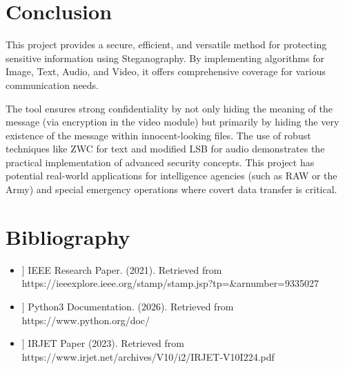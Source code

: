 \documentclass[12pt,a4paper]{report}
\begin{document}
\chapter*{Conclusion}
This project provides a secure, efficient, and versatile method for protecting sensitive information using Steganography. By implementing algorithms for Image, Text, Audio, and Video, it offers comprehensive coverage for various communication needs. 

The tool ensures strong confidentiality by not only hiding the meaning of the message (via encryption in the video module) but primarily by hiding the very existence of the message within innocent-looking files. The use of robust techniques like ZWC for text and modified LSB for audio demonstrates the practical implementation of advanced security concepts. This project has potential real-world applications for intelligence agencies (such as RAW or the Army) and special emergency operations where covert data transfer is critical.

\cleardoublepage



\chapter*{Bibliography}

\begin{itemize}
   
    \item [[ 1]]  IEEE Research Paper. (2021). Retrieved from https://ieeexplore.ieee.org/stamp/stamp.jsp?tp=&arnumber=9335027
    \item [[ 2]]  Python3 Documentation. (2026). Retrieved from https://www.python.org/doc/
    \item [[ 3]]  IRJET Paper (2023). Retrieved from https://www.irjet.net/archives/V10/i2/IRJET-V10I224.pdf
\end{itemize}
\end{document}
